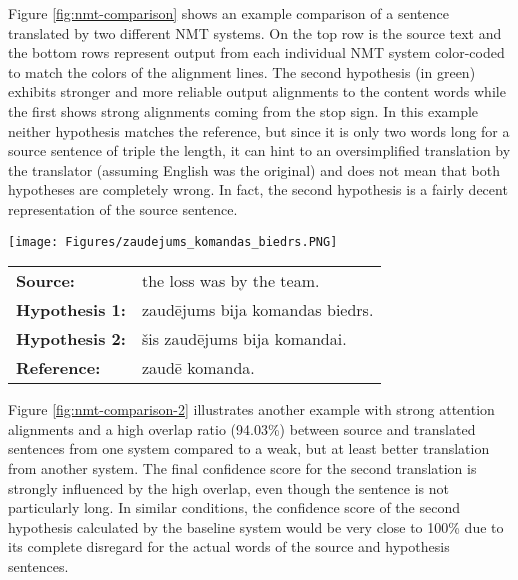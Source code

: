 \documentclass[runningheads,a4paper]{lncs/llncs}
\begin{document}
Figure \ref{fig:nmt-comparison} shows an example comparison of a sentence translated by two different NMT systems. On the top row is the source text and the bottom rows represent output from each individual NMT system color-coded to match the colors of the alignment lines. The second hypothesis (in green) exhibits stronger and more reliable output alignments to the content words while the first shows strong alignments coming from the stop sign. In this example neither hypothesis matches the reference, but since it is only two words long for a source sentence of triple the length, it can hint to an oversimplified translation by the translator (assuming English was the original) and does not mean that both hypotheses are completely wrong. In fact, the second hypothesis is a fairly decent representation of the source sentence.

\begin{figure*}[t]
  \texttt{[image: Figures/zaudejums\_komandas\_biedrs.PNG]}
  \begin{tabular}{lp{10.4cm}}
   \bf Source: & the loss was by the team. \\
   \bf Hypothesis 1: & zaudējums bija komandas biedrs. \\
   \bf Hypothesis 2: & šis zaudējums bija komandai. \\
   \bf Reference: & zaudē komanda. \\
  \end{tabular}
  \caption{A direct comparison of attention alignments for translating the same sentence with two different NMT systems.}
  \label{fig:nmt-comparison}
\end{figure*}

Figure \ref{fig:nmt-comparison-2} illustrates another example with strong attention alignments and a high overlap ratio (94.03\%) between source and translated sentences from one system compared to a weak, but at least better translation from another system. The final confidence score for the second translation is strongly influenced by the high overlap, even though the sentence is not particularly long. In similar conditions, the confidence score of the second hypothesis calculated by the baseline system would be very close to 100\% due to its complete disregard for the actual words of the source and hypothesis sentences. 
\end{document}

